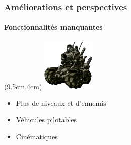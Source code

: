 \begin{frame}

\frametitle{Améliorations et perspectives}
	\framesubtitle{Fonctionnalités manquantes}


	\begin{textblock*}{2.5cm}(9.5cm,4cm)
		\includegraphics[width=2.5cm]{figures/vehicle.png}
	\end{textblock*}


	\begin{itemize}
		\item{Plus de niveaux et d'ennemis}
	\end{itemize}

	\begin{itemize}
		\item{Véhicules pilotables}
	\end{itemize}

	\begin{itemize}
		\item{Cinématiques}
	\end{itemize}

	
\end{frame}
